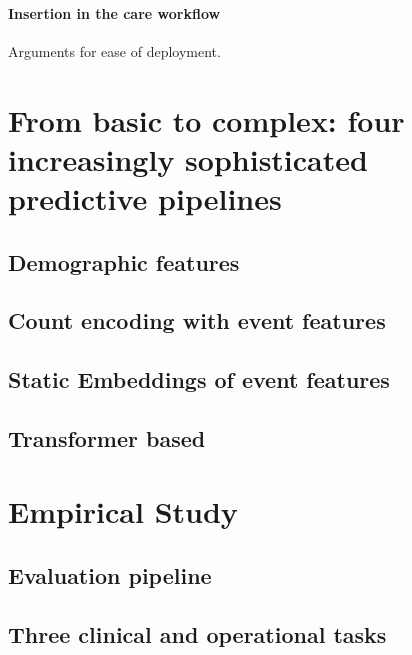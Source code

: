 \documentclass{report}
\begin{document}
\paragraph{Insertion in the care workflow}

Arguments for ease of deployment.

\section{From basic to complex: four increasingly sophisticated predictive pipelines}\label{sec:predictive_models:pipelines}

\subsection{Demographic features}\label{subsec:predictive_models:demographic}

\subsection{Count encoding with event features}\label{subsec:predictive_models:count_encoding}

\subsection{Static Embeddings of event features}

\subsection{Transformer based}\label{subsec:predictive_models:transformer}

\section{Empirical Study}\label{sec:predictive_models:empirical_study}

\subsection{Evaluation pipeline}\label{subsec:predictive_models:evaluation_pipeline}

\subsection{Three clinical and operational tasks}\label{subsec:predictive_models:task_definitions}
\end{document}

